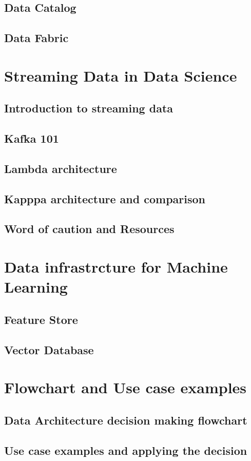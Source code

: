 \documentclass[a4paper, 11pt]{article}
\begin{document}
    \subsection{Data Catalog}

    \subsection{Data Fabric}

    \section{Streaming Data in Data Science}

    \subsection{Introduction to streaming data}
    
    \subsection{Kafka 101} %
    
    \subsection{Lambda architecture}
    
    \subsection{Kapppa architecture and comparison}
    
    \subsection{Word of caution and Resources}

    \section{Data infrastrcture for Machine Learning}

    \subsection{Feature Store}

    \subsection{Vector Database}

    \section{Flowchart and Use case examples}

    \subsection{Data Architecture decision making flowchart}

    \subsection{Use case examples and applying the decision}
\end{document}
